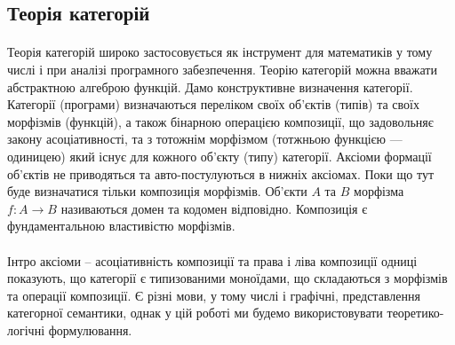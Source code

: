 \newpage
\subsection{Теорія категорій}

\paragraph{}
Теорія категорій широко застосовується як інструмент для математиків у тому числі і
при аналізі програмного забезпечення. Теорію категорій можна вважати абстрактною алгеброю функцій.
Дамо конструктивне визначення категорії.
Категорії (програми) визначаються переліком своїх об’єктів (типів) та своїх
морфізмів (функцій), а також бінарною операцією композиції,
що задовольняє закону асоціативності, та з тотожнім морфізмом (тотжньою функцією --- одиницею) який існує
для кожного об’єкту (типу) категорії. Аксіоми формації об’єктів не
приводяться та авто-постулуються в нижніх аксіомах.
Поки що тут буде визначатися тільки композиція морфізмів. Об’єкти $A$ та $B$ морфізма $f: A \rightarrow B$
називаються домен та кодомен відповідно. Композиція є фундаментальною властивістю морфізмів.

\paragraph{}
Інтро аксіоми -- асоціативність композиції та права і ліва композиції одниці показують,
що категорії є типизованими моноїдами, що складаються з морфізмів та операції композиції.
Є різні мови, у тому числі і графічні, представлення категорної семантики, однак у цій роботі
ми будемо використовувати теоретико-логічні формулювання.

